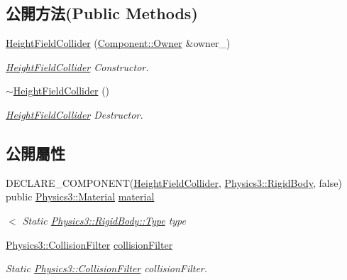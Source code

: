 \subsection*{公開方法(Public Methods)}
\begin{DoxyCompactItemize}
\item 
\hyperlink{class_magnum_1_1_height_field_collider_a99b69bdb09f89bbf80008cd6e9387dc8}{Height\+Field\+Collider} (\hyperlink{class_magnum_1_1_component_1_1_owner}{Component\+::\+Owner} \&owner\+\_\+)
\begin{DoxyCompactList}\small\item\em \hyperlink{class_magnum_1_1_height_field_collider}{Height\+Field\+Collider} Constructor. \end{DoxyCompactList}\item 
\hyperlink{class_magnum_1_1_height_field_collider_acd0e4168c3ac63f938ab24bc0f93aa3e}{$\sim$\+Height\+Field\+Collider} ()
\begin{DoxyCompactList}\small\item\em \hyperlink{class_magnum_1_1_height_field_collider}{Height\+Field\+Collider} Destructor. \end{DoxyCompactList}\end{DoxyCompactItemize}
\subsection*{公開屬性}
\begin{DoxyCompactItemize}
\item 
D\+E\+C\+L\+A\+R\+E\+\_\+\+C\+O\+M\+P\+O\+N\+E\+NT(\hyperlink{class_magnum_1_1_height_field_collider}{Height\+Field\+Collider}, \hyperlink{class_magnum_1_1_physics3_1_1_rigid_body}{Physics3\+::\+Rigid\+Body}, false) public \hyperlink{class_magnum_1_1_physics3_1_1_material}{Physics3\+::\+Material} \hyperlink{class_magnum_1_1_height_field_collider_a05215bb23992ced782a632f8a8ce24bf}{material}
\begin{DoxyCompactList}\small\item\em $<$ Static \hyperlink{class_magnum_1_1_physics3_1_1_rigid_body_a429aa4fb7256b083334c86cdcd0d6b31}{Physics3\+::\+Rigid\+Body\+::\+Type} type \end{DoxyCompactList}\item 
\hyperlink{class_magnum_1_1_physics3_1_1_collision_filter}{Physics3\+::\+Collision\+Filter} \hyperlink{class_magnum_1_1_height_field_collider_aa8bf663a7c044ef0a088384ea1bf81cb}{collision\+Filter}\hypertarget{class_magnum_1_1_height_field_collider_aa8bf663a7c044ef0a088384ea1bf81cb}{}\label{class_magnum_1_1_height_field_collider_aa8bf663a7c044ef0a088384ea1bf81cb}

\begin{DoxyCompactList}\small\item\em Static \hyperlink{class_magnum_1_1_physics3_1_1_collision_filter}{Physics3\+::\+Collision\+Filter} collision\+Filter. \end{DoxyCompactList}\end{DoxyCompactItemize}
